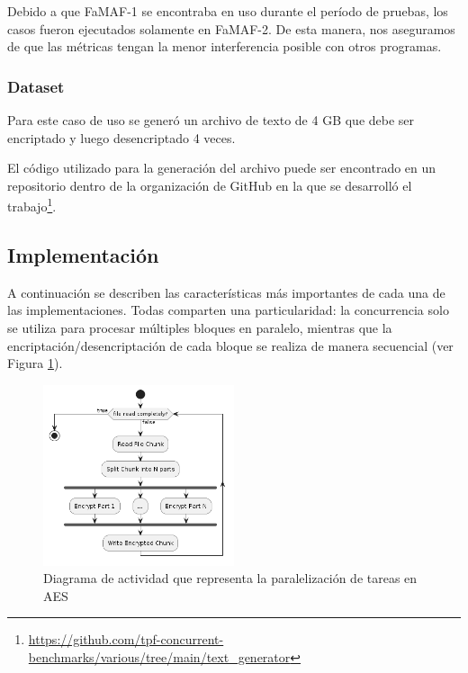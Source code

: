 \documentclass[11pt]{article}
\let\Oldsubsection\subsection
\renewcommand{\subsection}{\FloatBarrier\Oldsubsection}
\let\Oldsubsubsection\subsubsection
\renewcommand{\subsubsection}{\FloatBarrier\Oldsubsubsection}
\begin{document}
Debido a que FaMAF-1 se encontraba en uso durante el período de pruebas, los casos fueron ejecutados solamente en FaMAF-2. De esta manera, nos aseguramos de que las métricas tengan la menor interferencia posible con otros programas.

\subsubsection{Dataset}

Para este caso de uso se generó un archivo de texto de 4 GB que debe ser encriptado y luego desencriptado 4 veces.

El código utilizado para la generación del archivo puede ser encontrado en un repositorio dentro de la organización de GitHub en la que se desarrolló el trabajo\footnote{\url{https://github.com/tpf-concurrent-benchmarks/various/tree/main/text_generator}}.

\subsection{Implementación}

A continuación se describen las características más importantes de cada una de las implementaciones. Todas comparten una particularidad: la concurrencia solo se utiliza para procesar múltiples bloques en paralelo, mientras que la encriptación/desencriptación de cada bloque se realiza de manera secuencial (ver Figura \ref{fig:aes:activity}).

\begin{figure}[h]
    \centering
    \includegraphics[width=0.5\textwidth]{resources/aes/activity_diagram.png}
    \caption{Diagrama de actividad que representa la paralelización de tareas en AES}
    \label{fig:aes:activity}
\end{figure}
\end{document}
